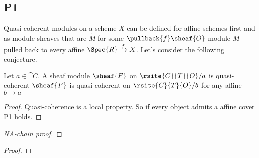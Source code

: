 \subsection{P1}

Quasi-coherent modules on a scheme $X$ can be defined for affine schemes first and  as module sheaves that are $\tilde{M}$ for some $\pullback{f}\sheaf{O}$-module $M$ pulled back to every affine $\Spec{R}\xrightarrow{f} X$. 
Let's consider the following conjecture. 

\begin{conjecture}[P1]
Let $a\in \cat{C}$.
A sheaf module $\sheaf{F}$ on $\rsite{C}{T}{O}/a$ is quasi-coherent \iff $\sheaf{F}$ is quasi-coherent on $\rsite{C}{T}{O}/b$ for any affine $b\rightarrow a$
\end{conjecture}





\begin{proof}
Quasi-coherence is a local property. So if every object admits a affine cover P1 holds.
\end{proof}


\begin{proof}[NA-chain proof]

\end{proof}


\begin{proof}

\end{proof}


